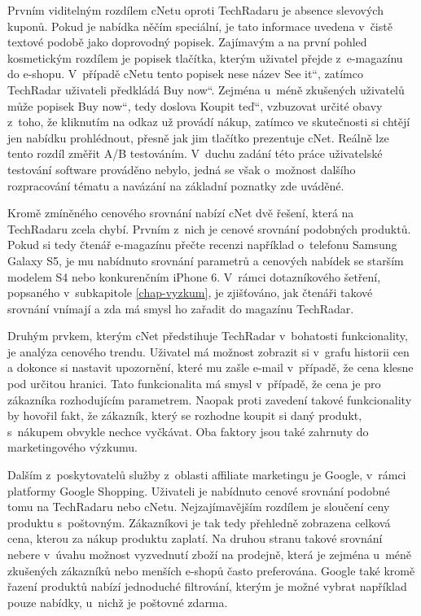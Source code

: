 \documentclass[12pt,oneside,openany]{fithesis}
\begin{document}
Prvním viditelným rozdílem cNetu oproti TechRadaru je absence slevových 
kuponů. Pokud je nabídka něčím speciální, je tato informace uvedena 
v~čistě textové podobě jako doprovodný popisek. Zajímavým a na první 
pohled kosmetickým rozdílem je popisek tlačítka, kterým uživatel přejde 
z~e-magazínu do e-shopu. V~případě cNetu tento popisek nese název \glqq 
See it\textquotedblleft{}, zatímco TechRadar uživateli předkládá \glqq Buy 
now\textquotedblleft{}. Zejména u~méně zkušených uživatelů může 
popisek \glqq Buy now\textquotedblleft{}, tedy doslova \glqq Koupit 
teď\textquotedblleft{}, vzbuzovat určité obavy z~toho, že kliknutím na 
odkaz už provádí nákup, zatímco ve skutečnosti si chtějí jen nabídku 
prohlédnout, přesně jak jim tlačítko prezentuje cNet. Reálně lze tento 
rozdíl změřit A/B testováním. \cite{ab-testing}{} V~duchu zadání této 
práce uživatelské testování software prováděno nebylo, jedná se však 
o~možnost dalšího rozpracování tématu a navázání na základní 
poznatky zde uváděné.

Kromě zmíněného cenového srovnání nabízí cNet dvě řešení, která 
na TechRadaru zcela chybí. Prvním z~nich je cenové srovnání podobných 
produktů. Pokud si tedy čtenář e-magazínu přečte recenzi například 
o~telefonu Samsung Galaxy S5, je mu nabídnuto srovnání parametrů a 
cenových nabídek se starším modelem S4 nebo konkurenčním iPhone 6. 
V~rámci dotazníkového šetření, popsaného v~subkapitole 
\hyperlink{chap-vyzkum}{{\ref{chap-vyzkum}}}, je zjišťováno, jak čtenáři 
takové srovnání vnímají a zda má smysl ho zařadit do magazínu TechRadar.

Druhým prvkem, kterým cNet předstihuje TechRadar v~bohatosti funkcionality, 
je analýza cenového trendu. Uživatel má možnost zobrazit si v~grafu 
historii cen a dokonce si nastavit upozornění, které mu zašle e-mail 
v~případě, že cena klesne pod určitou hranici. Tato funkcionalita má 
smysl v~případě, že cena je pro zákazníka rozhodujícím parametrem. 
Naopak proti zavedení takové funkcionality by hovořil fakt, že zákazník, 
který se rozhodne koupit si daný produkt, s~nákupem obvykle nechce 
vyčkávat. Oba faktory jsou také zahrnuty do marketingového výzkumu.

Dalším z~poskytovatelů služby z~oblasti affiliate marketingu je Google, 
v~rámci platformy Google Shopping. Uživateli je nabídnuto cenové srovnání 
podobné tomu na TechRadaru nebo cNetu. Nejzajímavějším rozdílem je 
sloučení ceny produktu s~poštovným. Zákazníkovi je tak tedy přehledně 
zobrazena celková cena, kterou za nákup produktu zaplatí. Na druhou stranu 
takové srovnání nebere v~úvahu možnost vyzvednutí zboží na prodejně, 
která je zejména u~méně zkušených zákazníků nebo menších e-shopů 
často preferována. Google také kromě řazení produktů nabízí 
jednoduché filtrování, kterým je možné vybrat například pouze nabídky, 
u~nichž je poštovné zdarma.
\end{document}
